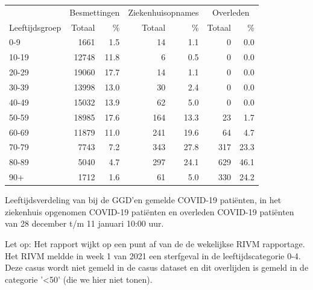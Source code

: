 \documentclass[
  english,
  man,floatsintext]{apa6}
\begin{document}
\begin{table}[H]
\centering\begingroup\fontsize{11}{13}\selectfont

\begin{threeparttable}
\begin{tabular}{lrrrrrr}
\toprule
\multicolumn{1}{c}{ } & \multicolumn{2}{c}{Besmettingen} & \multicolumn{2}{c}{Ziekenhuisopnames} & \multicolumn{2}{c}{Overleden} \\
\cmidrule(l{3pt}r{3pt}){2-3} \cmidrule(l{3pt}r{3pt}){4-5} \cmidrule(l{3pt}r{3pt}){6-7}
Leeftijdsgroep & Totaal & \% & Totaal & \% & Totaal & \%\\
\midrule
0-9 & 1661 & 1.5 & 14 & 1.1 & 0 & 0.0\\
10-19 & 12748 & 11.8 & 6 & 0.5 & 0 & 0.0\\
20-29 & 19060 & 17.7 & 14 & 1.1 & 0 & 0.0\\
30-39 & 13998 & 13.0 & 30 & 2.4 & 0 & 0.0\\
40-49 & 15032 & 13.9 & 62 & 5.0 & 0 & 0.0\\
50-59 & 18985 & 17.6 & 164 & 13.3 & 23 & 1.7\\
60-69 & 11879 & 11.0 & 241 & 19.6 & 64 & 4.7\\
70-79 & 7743 & 7.2 & 343 & 27.8 & 317 & 23.3\\
80-89 & 5040 & 4.7 & 297 & 24.1 & 629 & 46.1\\
90+ & 1712 & 1.6 & 61 & 5.0 & 330 & 24.2\\
\bottomrule
\end{tabular}
\begin{tablenotes}
\item[1] Leeftijdsverdeling van bij de GGD’en gemelde COVID-19 patiënten, in het ziekenhuis opgenomen COVID-19 patiënten en overleden COVID-19 patiënten van 28 december t/m 11 januari 10:00 uur.
\item[2] Let op: Het rapport wijkt op een punt af van de de wekelijkse RIVM rapportage. Het RIVM meldde in week 1 van 2021 een sterfgeval in de leeftijdscategorie 0-4. Deze casus wordt niet gemeld in de casus dataset en dit overlijden is gemeld in de categorie '<50' (die we hier niet tonen).
\end{tablenotes}
\end{threeparttable}
\endgroup{}
\end{table}

\newpage
\end{document}

